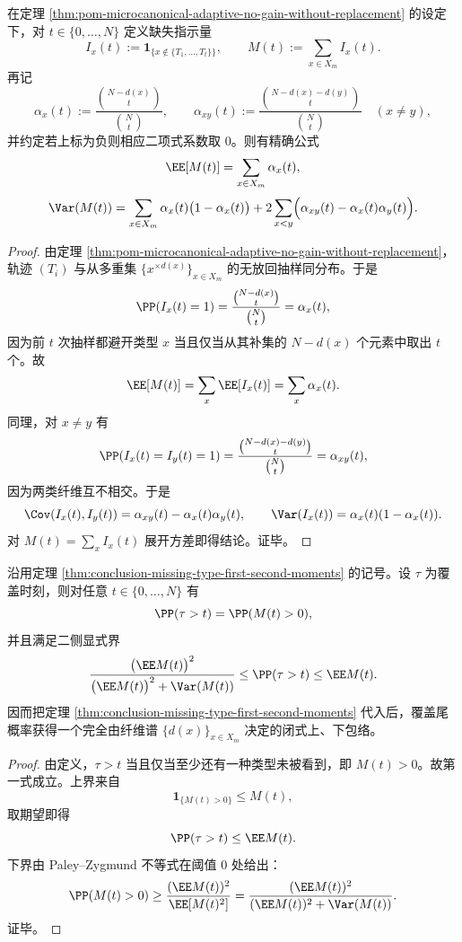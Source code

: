 \begin{theorem}\label{thm:conclusion-missing-type-first-second-moments}
在定理 \ref{thm:pom-microcanonical-adaptive-no-gain-without-replacement} 的设定下，对 \(t\in\{0,\dots,N\}\) 定义缺失指示量
\[
I_x(t):=\mathbf 1_{\{x\notin\{T_1,\dots,T_t\}\}},
\qquad
M(t):=\sum_{x\in X_m}I_x(t).
\]
再记
\[
\alpha_x(t):=\frac{\binom{N-d(x)}{t}}{\binom Nt},
\qquad
\alpha_{xy}(t):=\frac{\binom{N-d(x)-d(y)}{t}}{\binom Nt}\quad(x\ne y),
\]
并约定若上标为负则相应二项式系数取 \(0\)。则有精确公式
\[
\EE[M(t)]=\sum_{x\in X_m}\alpha_x(t),
\]
\[
\Var(M(t))
=
\sum_{x\in X_m}\alpha_x(t)\bigl(1-\alpha_x(t)\bigr)
+2\sum_{x<y}\Bigl(\alpha_{xy}(t)-\alpha_x(t)\alpha_y(t)\Bigr).
\]
\end{theorem}
\begin{proof}
由定理 \ref{thm:pom-microcanonical-adaptive-no-gain-without-replacement}，轨迹 \((T_i)\) 与从多重集 \(\{x^{\times d(x)}\}_{x\in X_m}\) 的无放回抽样同分布。于是
\[
\PP(I_x(t)=1)=\frac{\binom{N-d(x)}{t}}{\binom Nt}=\alpha_x(t),
\]
因为前 \(t\) 次抽样都避开类型 \(x\) 当且仅当从其补集的 \(N-d(x)\) 个元素中取出 \(t\) 个。故
\[
\EE[M(t)]=\sum_x \EE[I_x(t)]=\sum_x \alpha_x(t).
\]
同理，对 \(x\ne y\) 有
\[
\PP(I_x(t)=I_y(t)=1)
=
\frac{\binom{N-d(x)-d(y)}{t}}{\binom Nt}
=
\alpha_{xy}(t),
\]
因为两类纤维互不相交。于是
\[
\Cov(I_x(t),I_y(t))=\alpha_{xy}(t)-\alpha_x(t)\alpha_y(t),
\qquad
\Var(I_x(t))=\alpha_x(t)(1-\alpha_x(t)).
\]
对
\(
M(t)=\sum_x I_x(t)
\)
展开方差即得结论。证毕。
\end{proof}

\begin{corollary}[覆盖尾概率的二侧压缩公式]\label{cor:conclusion-cover-time-tail-two-sided-compression}
沿用定理 \ref{thm:conclusion-missing-type-first-second-moments} 的记号。设 \(\tau\) 为覆盖时刻，则对任意 \(t\in\{0,\dots,N\}\) 有
\[
\PP(\tau>t)=\PP(M(t)>0),
\]
并且满足二侧显式界
\[
\frac{\bigl(\EE M(t)\bigr)^2}{\bigl(\EE M(t)\bigr)^2+\Var(M(t))}
\le
\PP(\tau>t)
\le
\EE M(t).
\]
因而把定理 \ref{thm:conclusion-missing-type-first-second-moments} 代入后，覆盖尾概率获得一个完全由纤维谱 \(\{d(x)\}_{x\in X_m}\) 决定的闭式上、下包络。
\end{corollary}
\begin{proof}
由定义，\(\tau>t\) 当且仅当至少还有一种类型未被看到，即 \(M(t)>0\)。故第一式成立。上界来自
\[
\mathbf 1_{\{M(t)>0\}}\le M(t),
\]
取期望即得
\[
\PP(\tau>t)\le \EE M(t).
\]
下界由 Paley--Zygmund 不等式在阈值 \(0\) 处给出：
\[
\PP(M(t)>0)\ge \frac{(\EE M(t))^2}{\EE[M(t)^2]}
=
\frac{(\EE M(t))^2}{(\EE M(t))^2+\Var(M(t))}.
\]
证毕。
\end{proof}

